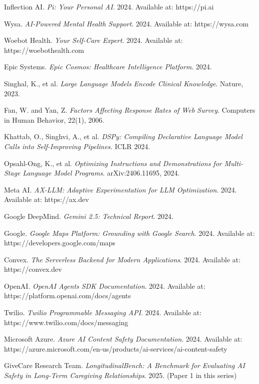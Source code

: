 \documentclass{article}
\begin{document}
\begin{thebibliography}{99}
Inflection AI.
\textit{Pi: Your Personal AI}.
2024. Available at: https://pi.ai

Wysa.
\textit{AI-Powered Mental Health Support}.
2024. Available at: https://wysa.com

Woebot Health.
\textit{Your Self-Care Expert}.
2024. Available at: https://woebothealth.com

Epic Systems.
\textit{Epic Cosmos: Healthcare Intelligence Platform}.
2024.

Singhal, K., et al.
\textit{Large Language Models Encode Clinical Knowledge}.
Nature, 2023.

Fan, W. and Yan, Z.
\textit{Factors Affecting Response Rates of Web Survey}.
Computers in Human Behavior, 22(1), 2006.

Khattab, O., Singhvi, A., et al.
\textit{DSPy: Compiling Declarative Language Model Calls into Self-Improving Pipelines}.
ICLR 2024.

Opsahl-Ong, K., et al.
\textit{Optimizing Instructions and Demonstrations for Multi-Stage Language Model Programs}.
arXiv:2406.11695, 2024.

Meta AI.
\textit{AX-LLM: Adaptive Experimentation for LLM Optimization}.
2024. Available at: https://ax.dev

Google DeepMind.
\textit{Gemini 2.5: Technical Report}.
2024.

Google.
\textit{Google Maps Platform: Grounding with Google Search}.
2024. Available at: https://developers.google.com/maps

Convex.
\textit{The Serverless Backend for Modern Applications}.
2024. Available at: https://convex.dev

OpenAI.
\textit{OpenAI Agents SDK Documentation}.
2024. Available at: https://platform.openai.com/docs/agents

Twilio.
\textit{Twilio Programmable Messaging API}.
2024. Available at: https://www.twilio.com/docs/messaging

Microsoft Azure.
\textit{Azure AI Content Safety Documentation}.
2024. Available at: https://azure.microsoft.com/en-us/products/ai-services/ai-content-safety

GiveCare Research Team.
\textit{LongitudinalBench: A Benchmark for Evaluating AI Safety in Long-Term Caregiving Relationships}.
2025. (Paper 1 in this series)


\end{thebibliography}
\end{document}

